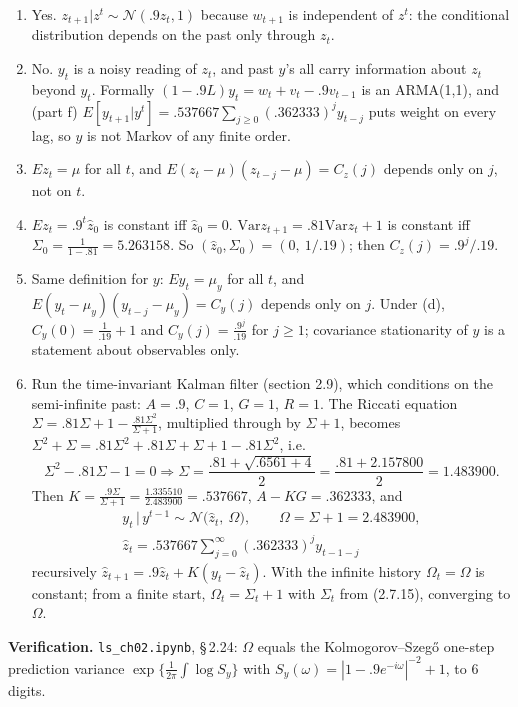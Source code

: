 \documentclass[12pt, letterpaper]{article}
\newcommand{\Var}{\mathrm{Var}}
\newcommand{\nb}[1]{\texttt{ls\_ch02.ipynb}, \S\,#1}
\begin{document}
\begin{tcolorbox}[evenbox,title={Exercise 2.24 \quad Stationarity}]
\begin{enumerate}
\item Yes. $z_{t+1}|z^t\sim\mathcal N(.9z_t,1)$ because $w_{t+1}$ is independent of $z^t$: the
conditional distribution depends on the past only through $z_t$.
\item No. $y_t$ is a noisy reading of $z_t$, and past $y$'s all carry information about $z_t$ beyond
$y_t$. Formally $(1-.9L)y_t=w_t+v_t-.9v_{t-1}$ is an ARMA(1,1), and (part f)
$E[y_{t+1}|y^t]=.537667\sum_{j\ge0}(.362333)^jy_{t-j}$ puts weight on every lag, so $y$ is not Markov
of any finite order.
\item $Ez_t=\mu$ for all $t$, and $E(z_t-\mu)(z_{t-j}-\mu)=C_z(j)$ depends only on $j$, not on $t$.
\item $Ez_t=.9^t\hat z_0$ is constant iff $\hat z_0=0$. $\Var z_{t+1}=.81\Var z_t+1$ is constant iff
$\Sigma_0=\frac1{1-.81}=5.263158$. So $\boxed{(\hat z_0,\Sigma_0)=(0,\ 1/.19)}$; then
$C_z(j)=.9^j/.19$.
\item Same definition for $y$: $Ey_t=\mu_y$ for all $t$, and $E(y_t-\mu_y)(y_{t-j}-\mu_y)=C_y(j)$
depends only on $j$. Under (d), $C_y(0)=\frac{1}{.19}+1$ and $C_y(j)=\frac{.9^j}{.19}$ for $j\ge1$;
covariance stationarity of $y$ is a statement about observables only.
\item Run the time-invariant Kalman filter (section 2.9), which conditions on the semi-infinite past:
$A=.9$, $C=1$, $G=1$, $R=1$. The Riccati equation $\Sigma=.81\Sigma+1-\frac{.81\Sigma^2}{\Sigma+1}$,
multiplied through by $\Sigma+1$, becomes $\Sigma^2+\Sigma=.81\Sigma^2+.81\Sigma+\Sigma+1-.81\Sigma^2$,
i.e.
\[
\Sigma^2-.81\Sigma-1=0\Rightarrow\Sigma=\frac{.81+\sqrt{.6561+4}}{2}=\frac{.81+2.157800}{2}=1.483900.
\]
Then $K=\frac{.9\Sigma}{\Sigma+1}=\frac{1.335510}{2.483900}=.537667$, $A-KG=.362333$, and
\[
\boxed{\begin{gathered}y_t\,|\,y^{t-1}\sim\mathcal N\big(\hat z_t,\ \Omega\big),\qquad \Omega=\Sigma+1=2.483900,\\
\hat z_t=.537667\sum_{j=0}^\infty(.362333)^jy_{t-1-j}\end{gathered}}
\]
recursively $\hat z_{t+1}=.9\hat z_t+K(y_t-\hat z_t)$. With the infinite history $\Omega_t=\Omega$ is
constant; from a finite start, $\Omega_t=\Sigma_t+1$ with $\Sigma_t$ from (2.7.15), converging to
$\Omega$.
\end{enumerate}

\textbf{Verification.} \nb{2.24}: $\Omega$ equals the Kolmogorov--Szeg\H{o} one-step prediction variance
$\exp\{\frac1{2\pi}\int\log S_y\}$ with $S_y(\omega)=|1-.9e^{-i\omega}|^{-2}+1$, to 6 digits. \checkmark
\end{tcolorbox}
\end{document}
